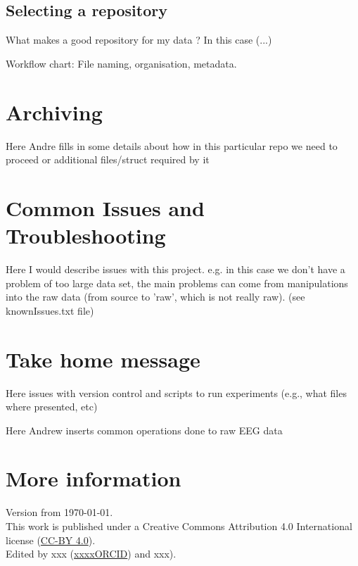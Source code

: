 \documentclass[a4paper,11pt]{report}\usepackage[]{graphicx}\usepackage[dvipsnames]{xcolor}
\begin{document}
\subsection*{Selecting a repository}
What makes a good repository for my data ? In this case (...)

Workflow chart: File naming, organisation, metadata.

\section*{Archiving} 
Here Andre fills in  some details about how in this particular repo we need to proceed or additional files/struct required by it


\section*{Common Issues and Troubleshooting} 
Here I would describe issues with this project. e.g. in this case we don't have a problem of too large data set, the main problems can come from manipulations into the raw data (from source to 'raw', which is not really raw). (see knownIssues.txt file)


\section*{Take home message} 

\begin{tcolorbox}[enhanced,fit to height=10cm,
  colback=linkgreen!85!black!10!white,colframe=linkgreen!75!black,title= \Large Technical Box 1 - Archiving scripts for stimuli presentation ,
  drop fuzzy shadow,watermark color=white,watermark text=CRS]
  
Here issues with version control and scripts to run experiments (e.g., what files where presented, etc)   
\end{tcolorbox}

\begin{tcolorbox}[enhanced,fit to height=10cm,
  colback=linkgreen!85!black!10!white,colframe=linkgreen!75!black,title= \Large Technical Box 2 - Challenges of EEG experiments ,
  drop fuzzy shadow,watermark color=white,watermark text=CRS]

  Here Andrew inserts common operations done to raw EEG data 
\end{tcolorbox}


\section*{More information}




\vfill
\scriptsize
Version from \today. \\
This work is published under a Creative Commons Attribution 4.0 International license
(\href{https://creativecommons.org/licenses/by/4.0/}{CC-BY 4.0}). \\
Edited by xxx (\href{https://orcid.org/0000-0003-2779-320X}{xxxxORCID}) and 
xxx). \\
\end{document}
